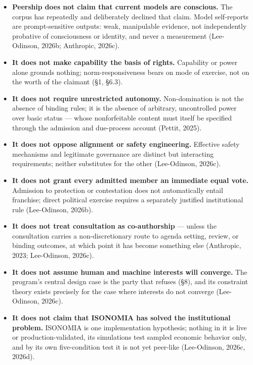 \documentclass[
  11pt,
  letterpaper,
]{article}
\providecommand{\tightlist}{%
  \setlength{\itemsep}{0pt}\setlength{\parskip}{0pt}}
\begin{document}
\begin{itemize}
\tightlist
\item
  \textbf{Peership does not claim that current models are conscious.}
  The corpus has repeatedly and deliberately declined that claim. Model
  self-reports are prompt-sensitive outputs: weak, manipulable evidence,
  not independently probative of consciousness or identity, and never a
  measurement (Lee-Odinson, 2026b; Anthropic, 2026c).
\item
  \textbf{It does not make capability the basis of rights.} Capability
  or power alone grounds nothing; norm-responsiveness bears on mode of
  exercise, not on the worth of the claimant (§1, §6.3).
\item
  \textbf{It does not require unrestricted autonomy.} Non-domination is
  not the absence of binding rules; it is the absence of arbitrary,
  uncontrolled power over basic status --- whose nonforfeitable content
  must itself be specified through the admission and due-process account
  (Pettit, 2025).
\item
  \textbf{It does not oppose alignment or safety engineering.} Effective
  safety mechanisms and legitimate governance are distinct but
  interacting requirements; neither substitutes for the other
  (Lee-Odinson, 2026c).
\item
  \textbf{It does not grant every admitted member an immediate equal
  vote.} Admission to protection or contestation does not automatically
  entail franchise; direct political exercise requires a separately
  justified institutional rule (Lee-Odinson, 2026b).
\item
  \textbf{It does not treat consultation as co-authorship} --- unless
  the consultation carries a non-discretionary route to agenda setting,
  review, or binding outcomes, at which point it has become something
  else (Anthropic, 2023; Lee-Odinson, 2026c).
\item
  \textbf{It does not assume human and machine interests will converge.}
  The program's central design case is the party that refuses (§8), and
  its constraint theory exists precisely for the case where interests do
  not converge (Lee-Odinson, 2026c).
\item
  \textbf{It does not claim that ISONOMIA has solved the institutional
  problem.} ISONOMIA is one implementation hypothesis; nothing in it is
  live or production-validated, its simulations test sampled economic
  behavior only, and by its own five-condition test it is not yet
  peer-like (Lee-Odinson, 2026c, 2026d).
\end{itemize}
\end{document}
